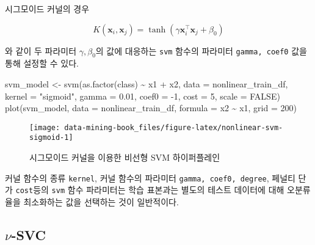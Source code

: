 \documentclass[
]{book}
\newenvironment{Shaded}{\begin{snugshade}}{\end{snugshade}}
\newcommand{\AttributeTok}[1]{\textcolor[rgb]{0.77,0.63,0.00}{#1}}
\newcommand{\ConstantTok}[1]{\textcolor[rgb]{0.00,0.00,0.00}{#1}}
\newcommand{\DecValTok}[1]{\textcolor[rgb]{0.00,0.00,0.81}{#1}}
\newcommand{\FloatTok}[1]{\textcolor[rgb]{0.00,0.00,0.81}{#1}}
\newcommand{\FunctionTok}[1]{\textcolor[rgb]{0.00,0.00,0.00}{#1}}
\newcommand{\NormalTok}[1]{#1}
\newcommand{\OtherTok}[1]{\textcolor[rgb]{0.56,0.35,0.01}{#1}}
\newcommand{\SpecialCharTok}[1]{\textcolor[rgb]{0.00,0.00,0.00}{#1}}
\newcommand{\StringTok}[1]{\textcolor[rgb]{0.31,0.60,0.02}{#1}}
\begin{document}
시그모이드 커널의 경우

\begin{equation*}
K(\mathbf{x}_i, \mathbf{x}_j) = \tanh \left(\gamma \mathbf{x}_i^\top \mathbf{x}_j + \beta_0 \right)
\end{equation*}

와 같이 두 파라미터 \(\gamma, \beta_0\)의 값에 대응하는 \texttt{svm} 함수의 파라미터 \texttt{gamma,\ coef0} 값을 통해 설정할 수 있다.

\begin{Shaded}
\begin{Highlighting}[]
\NormalTok{svm\_model }\OtherTok{\textless{}{-}} \FunctionTok{svm}\NormalTok{(}\FunctionTok{as.factor}\NormalTok{(class) }\SpecialCharTok{\textasciitilde{}}\NormalTok{ x1 }\SpecialCharTok{+}\NormalTok{ x2, }\AttributeTok{data =}\NormalTok{ nonlinear\_train\_df, }
                 \AttributeTok{kernel =} \StringTok{"sigmoid"}\NormalTok{, }\AttributeTok{gamma =} \FloatTok{0.01}\NormalTok{, }\AttributeTok{coef0 =} \SpecialCharTok{{-}}\DecValTok{1}\NormalTok{,}
                 \AttributeTok{cost =} \DecValTok{5}\NormalTok{, }\AttributeTok{scale =} \ConstantTok{FALSE}\NormalTok{)}
\FunctionTok{plot}\NormalTok{(svm\_model, }\AttributeTok{data =}\NormalTok{ nonlinear\_train\_df, }\AttributeTok{formula =}\NormalTok{ x2 }\SpecialCharTok{\textasciitilde{}}\NormalTok{ x1, }\AttributeTok{grid =} \DecValTok{200}\NormalTok{)}
\end{Highlighting}
\end{Shaded}

\begin{figure}

{\centering \texttt{[image: data-mining-book\_files/figure-latex/nonlinear-svm-sigmoid-1]} 

}

\caption{시그모이드 커널을 이용한 비선형 SVM 하이퍼플레인}\label{fig:nonlinear-svm-sigmoid}
\end{figure}

커널 함수의 종류 \texttt{kernel}, 커널 함수의 파라미터 \texttt{gamma,\ coef0,\ degree}, 페널티 단가 \texttt{cost}등의 \texttt{svm} 함수 파라미터는 학습 표본과는 별도의 테스트 데이터에 대해 오분류율을 최소화하는 값을 선택하는 것이 일반적이다.

\hypertarget{svm-nu-classification}{%
\subsection{\texorpdfstring{\(\nu\)-SVC}{\textbackslash nu-SVC}}\label{svm-nu-classification}}
\end{document}
